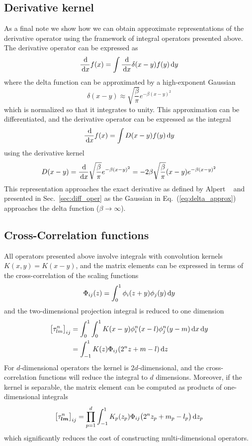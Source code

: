 \subsection{Derivative kernel}
As a final note we show how we can obtain approximate representations of the 
derivative operator using the framework of integral operators presented above. 
The derivative operator can be expressed as
\begin{equation}
    \frac{\,\mathrm{d}}{\,\mathrm{d} x} f(x) = \int \frac{\,\mathrm{d}}{\,\mathrm{d} x} \delta(x-y) f(y) \,\mathrm{d} y
\end{equation}
where the delta function can be approximated by a high-exponent Gaussian
\begin{equation}
    \label{eq:delta_approx}
    \delta(x-y) \approx \sqrt{\frac{\beta}{\pi}} e^{-\beta (x-y)^2}
\end{equation}
which is normalized so that it integrates to unity. This approximation can be 
differentiated, and the derivative operator can be expressed as the integral
\begin{equation}
    \frac{\,\mathrm{d}}{\,\mathrm{d} x} f(x) = \int D(x-y)f(y) \,\mathrm{d} y
\end{equation}
using the derivative kernel
\begin{equation}
    D(x-y)  = \frac{\,\mathrm{d}}{\,\mathrm{d} x} \sqrt{\frac{\beta}{\pi}}e^{-\beta (x-y)^2} 
	    = -2\beta \sqrt{\frac{\beta}{\pi}}(x-y)e^{-\beta (x-y)^2}
\end{equation}
This representation approaches the exact derivative as defined by Alpert 
\etal~\cite{Alpert:2002p149} and presented in Sec.~\ref{sec:diff_oper} as 
the Gaussian in Eq.~(\ref{eq:delta_approx}) approaches the delta function 
($\beta \rightarrow \infty$).

\subsection{Cross-Correlation functions}
All operators presented above involve integrals with convolution kernels
$K(x,y) = K(x-y)$, and the matrix elements can be expressed in terms of the
cross-correlation of the scaling functions~\cite{Fann:2004}
\begin{equation}
    \Phi_{ij}(z) = \int_0^1 \phi_i(z+y)\phi_j(y) \,\mathrm{d} y
\end{equation}
and the two-dimensional projection integral is reduced to one dimension
\begin{align}
    \big[\tau_{lm}^n\big]_{ij}
	&= \int_0^1 \int_0^1 K(x-y)\phi_i^n(x-l)\phi_j^n(y-m) \,\mathrm{d} x \,\mathrm{d} y \\
	&= \int_{-1}^1 K(z)\Phi_{ij}(2^nz+m-l)\,\mathrm{d} z
\end{align}
For $d$-dimensional operators the kernel is $2d$-dimensional, and the cross-correlation 
functions will reduce the integral to $d$ dimensions. Moreover, if the kernel is
separable, the matrix element can be computed as products of one-dimensional integrals
\begin{equation}
    \big[\tau_{\boldsymbol l\boldsymbol m}^n\big]_{ij} = \prod_{p=1}^d\int_{-1}^1 
	K_p(z_p)\Phi_{ij}\big(2^nz_p+m_p-l_p\big) \,\mathrm{d} z_p
\end{equation}
which significantly reduces the cost of constructing multi-dimensional operators. 

